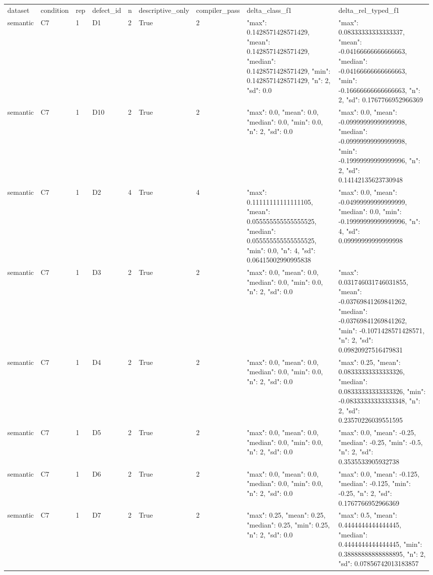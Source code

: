 \begin{tabular}{lllllllll}
dataset & condition & rep & defect\_id & n & descriptive\_only & compiler\_pass & delta\_class\_f1 & delta\_rel\_typed\_f1 \\
semantic & C7 & 1 & D1 & 2 & True & 2 & {"max": 0.1428571428571429, "mean": 0.1428571428571429, "median": 0.1428571428571429, "min": 0.1428571428571429, "n": 2, "sd": 0.0} & {"max": 0.08333333333333337, "mean": -0.04166666666666663, "median": -0.04166666666666663, "min": -0.16666666666666663, "n": 2, "sd": 0.1767766952966369} \\
semantic & C7 & 1 & D10 & 2 & True & 2 & {"max": 0.0, "mean": 0.0, "median": 0.0, "min": 0.0, "n": 2, "sd": 0.0} & {"max": 0.0, "mean": -0.09999999999999998, "median": -0.09999999999999998, "min": -0.19999999999999996, "n": 2, "sd": 0.14142135623730948} \\
semantic & C7 & 1 & D2 & 4 & True & 4 & {"max": 0.11111111111111105, "mean": 0.055555555555555525, "median": 0.055555555555555525, "min": 0.0, "n": 4, "sd": 0.06415002990995838} & {"max": 0.0, "mean": -0.04999999999999999, "median": 0.0, "min": -0.19999999999999996, "n": 4, "sd": 0.09999999999999998} \\
semantic & C7 & 1 & D3 & 2 & True & 2 & {"max": 0.0, "mean": 0.0, "median": 0.0, "min": 0.0, "n": 2, "sd": 0.0} & {"max": 0.031746031746031855, "mean": -0.03769841269841262, "median": -0.03769841269841262, "min": -0.1071428571428571, "n": 2, "sd": 0.09820927516479831} \\
semantic & C7 & 1 & D4 & 2 & True & 2 & {"max": 0.0, "mean": 0.0, "median": 0.0, "min": 0.0, "n": 2, "sd": 0.0} & {"max": 0.25, "mean": 0.08333333333333326, "median": 0.08333333333333326, "min": -0.08333333333333348, "n": 2, "sd": 0.23570226039551595} \\
semantic & C7 & 1 & D5 & 2 & True & 2 & {"max": 0.0, "mean": 0.0, "median": 0.0, "min": 0.0, "n": 2, "sd": 0.0} & {"max": 0.0, "mean": -0.25, "median": -0.25, "min": -0.5, "n": 2, "sd": 0.3535533905932738} \\
semantic & C7 & 1 & D6 & 2 & True & 2 & {"max": 0.0, "mean": 0.0, "median": 0.0, "min": 0.0, "n": 2, "sd": 0.0} & {"max": 0.0, "mean": -0.125, "median": -0.125, "min": -0.25, "n": 2, "sd": 0.1767766952966369} \\
semantic & C7 & 1 & D7 & 2 & True & 2 & {"max": 0.25, "mean": 0.25, "median": 0.25, "min": 0.25, "n": 2, "sd": 0.0} & {"max": 0.5, "mean": 0.4444444444444445, "median": 0.4444444444444445, "min": 0.38888888888888895, "n": 2, "sd": 0.07856742013183857} \\

\end{tabular}
